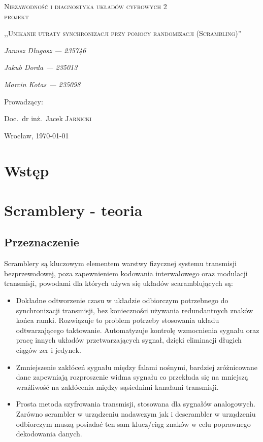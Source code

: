 \documentclass[polish, 11pt]{article}
\begin{document}
\begin{titlepage}
    \centering
    {\scshape\LARGE Niezawodność i diagnostyka układów cyfrowych 2\\ projekt \par}
    \vspace{1cm}
    {\scshape\Large,,Unikanie utraty synchronizacji przy pomocy randomizacji (Scrambling)''\par}
    \vspace{2cm}
    {\itshape\Large Janusz Długosz --- 235746\/\par}
    {\itshape\Large Jakub Dorda --- 235013\/\par}
    {\itshape\Large Marcin Kotas --- 235098\/\par}
    \vfill
    Prowadzący:\par
    Doc.~dr inż.~Jacek \textsc{Jarnicki}

    \vfill

    {\large Wrocław, \today\par}

\end{titlepage}

\section{Wstęp}

\section{Scramblery - teoria}
    \subsection{Przeznaczenie}
	    Scramblery są kluczowym elementem warstwy fizycznej systemu transmisji bezprzewodowej, poza zapewnieniem
	    kodowania interwałowego oraz modulacji transmisji, powodami dla których używa się układów scaramblujących są:
	    \begin{itemize}
	    	\item Dokładne odtworzenie czasu w układzie odbiorczym potrzebnego do synchronizacji transmisji,
	    	bez konieczności używania redundantnych znaków końca ramki. Rozwiązuje to problem potrzeby stosowania
	    	układu odtwarzającego taktowanie. Automatyzuje kontrolę wzmocnienia sygnału oraz pracę innych układów
	    	przetwarzających sygnał, dzięki eliminacji długich ciągów zer i jedynek.
	    	\item Zmniejszenie zakłóceń sygnału między falami nośnymi, bardziej zróżnicowane dane zapewniają
	    	rozproszenie widma sygnału co przekłada się na mniejszą wrażliwość na zakłócenia między sąsiednimi
	    	kanałami transmisji.
	    	\item Prosta metoda szyfrowania transmisji, stosowana dla sygnałów analogowych. Zarówno scrambler
	    	w urządzeniu nadawczym jak i descrambler w urządzeniu odbiorczym muszą posiadać ten sam klucz/ciąg
	    	znaków w celu poprawnego dekodowania danych.
	    \end{itemize}
	    
\end{document}
